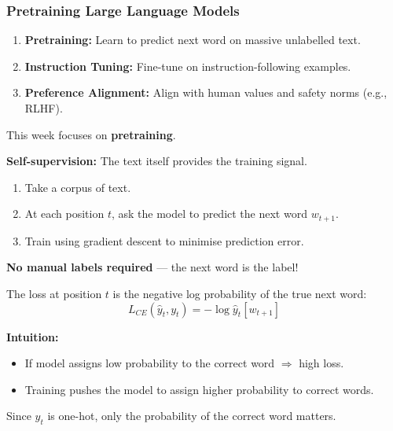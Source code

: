 \bigseparator

\subsubsection{Pretraining Large Language Models}

\begin{defbox}
\begin{enumerate}
  \item \textbf{Pretraining:} Learn to predict next word on massive unlabelled text.
  \item \textbf{Instruction Tuning:} Fine-tune on instruction-following examples.
  \item \textbf{Preference Alignment:} Align with human values and safety norms (e.g., RLHF).
\end{enumerate}

This week focuses on \textbf{pretraining}.
\end{defbox}

\begin{defbox}
\textbf{Self-supervision:} The text itself provides the training signal.
\begin{enumerate}
  \item Take a corpus of text.
  \item At each position $t$, ask the model to predict the next word $w_{t+1}$.
  \item Train using gradient descent to minimise prediction error.
\end{enumerate}

\textbf{No manual labels required} --- the next word is the label!
\end{defbox}

\begin{defbox}
The loss at position $t$ is the negative log probability of the true next word:
\[
L_{CE}(\hat{y}_t, y_t) = -\log \hat{y}_t[w_{t+1}]
\]

\textbf{Intuition:}
\begin{itemize}
  \item If model assigns low probability to the correct word $\Rightarrow$ high loss.
  \item Training pushes the model to assign higher probability to correct words.
\end{itemize}

Since $y_t$ is one-hot, only the probability of the correct word matters.
\end{defbox}

